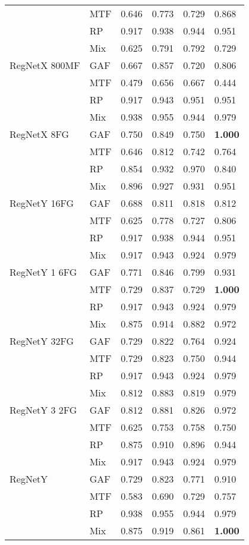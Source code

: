 \begin{tabular}[t]{llllll}
 & MTF & 0.646 & 0.773 & 0.729 & 0.868 \\
 & RP & 0.917 & 0.938 & 0.944 & 0.951 \\
 & Mix & 0.625 & 0.791 & 0.792 & 0.729 \\
RegNetX 800MF & GAF & 0.667 & 0.857 & 0.720 & 0.806 \\
 & MTF & 0.479 & 0.656 & 0.667 & 0.444 \\
 & RP & 0.917 & 0.943 & 0.951 & 0.951 \\
 & Mix & 0.938 & 0.955 & 0.944 & 0.979 \\
RegNetX 8FG & GAF & 0.750 & 0.849 & 0.750 & \textbf{1.000} \\
 & MTF & 0.646 & 0.812 & 0.742 & 0.764 \\
 & RP & 0.854 & 0.932 & 0.970 & 0.840 \\
 & Mix & 0.896 & 0.927 & 0.931 & 0.951 \\
RegNetY 16FG & GAF & 0.688 & 0.811 & 0.818 & 0.812 \\
 & MTF & 0.625 & 0.778 & 0.727 & 0.806 \\
 & RP & 0.917 & 0.938 & 0.944 & 0.951 \\
 & Mix & 0.917 & 0.943 & 0.924 & 0.979 \\
RegNetY 1 6FG & GAF & 0.771 & 0.846 & 0.799 & 0.931 \\
 & MTF & 0.729 & 0.837 & 0.729 & \textbf{1.000} \\
 & RP & 0.917 & 0.943 & 0.924 & 0.979 \\
 & Mix & 0.875 & 0.914 & 0.882 & 0.972 \\
RegNetY 32FG & GAF & 0.729 & 0.822 & 0.764 & 0.924 \\
 & MTF & 0.729 & 0.823 & 0.750 & 0.944 \\
 & RP & 0.917 & 0.943 & 0.924 & 0.979 \\
 & Mix & 0.812 & 0.883 & 0.819 & 0.979 \\
RegNetY 3 2FG & GAF & 0.812 & 0.881 & 0.826 & 0.972 \\
 & MTF & 0.625 & 0.753 & 0.758 & 0.750 \\
 & RP & 0.875 & 0.910 & 0.896 & 0.944 \\
 & Mix & 0.917 & 0.943 & 0.924 & 0.979 \\
RegNetY & GAF & 0.729 & 0.823 & 0.771 & 0.910 \\
 & MTF & 0.583 & 0.690 & 0.729 & 0.757 \\
 & RP & 0.938 & 0.955 & 0.944 & 0.979 \\
 & Mix & 0.875 & 0.919 & 0.861 & \textbf{1.000} \\
\bottomrule
\end{tabular}

